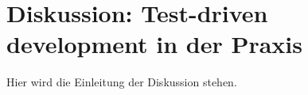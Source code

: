 \section{Diskussion: Test-driven development in der Praxis}\label{diskussion}

Hier wird die Einleitung der Diskussion stehen.





